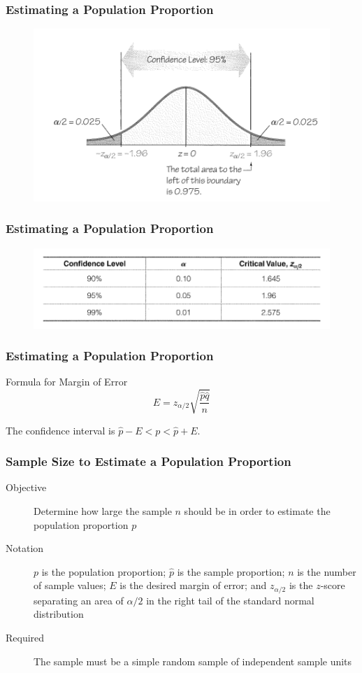 \documentclass[xcolor=dvipsnames]{beamer}
\begin{document}
\begin{frame}
  \frametitle{Estimating a Population Proportion}
\begin{figure}[h]
\includegraphics[scale=1]{./diagrams/triola-323a.png}
\end{figure}
\end{frame}

\begin{frame}
  \frametitle{Estimating a Population Proportion}
\begin{figure}[h]
\includegraphics[scale=1]{./diagrams/triola-323b.png}
\end{figure}
\end{frame}

\begin{frame}
  \frametitle{Estimating a Population Proportion}
  \begin{block}{Formula for Margin of Error}
    \begin{equation}
      \label{eq:fidahyei}
      E=z_{\alpha/2}\sqrt{\frac{\hat{p}\hat{q}}{n}}
    \end{equation}
  \end{block}

\bigskip

The \alert{confidence interval} is $\hat{p}-E<p<\hat{p}+E$.
\end{frame}

\begin{frame}
  \frametitle{Sample Size to Estimate a Population Proportion}
  \begin{description}
  \item[Objective] Determine how large the sample $n$ should be in
    order to estimate the population proportion $p$
  \item[Notation] $p$ is the population proportion; $\hat{p}$ is the
    sample proportion; $n$ is the number of sample values; $E$ is the
    desired margin of error; and $z_{\alpha/2}$ is the $z$-score
    separating an area of $\alpha/2$ in the right tail of the standard
    normal distribution
  \item[Required] The sample must be a simple random sample of
    independent sample units
  \end{description}
\end{frame}
\end{document}
